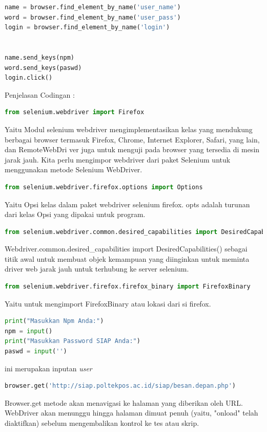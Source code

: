 \begin{enumerate}
\begin{lstlisting}[language=Python]
name = browser.find_element_by_name('user_name')
word = browser.find_element_by_name('user_pass')
login = browser.find_element_by_name('login')


name.send_keys(npm)
word.send_keys(paswd)
login.click()

\end{lstlisting}

Penjelasan Codingan :
\begin{lstlisting}[language=Python]
from selenium.webdriver import Firefox
\end{lstlisting}
Yaitu Modul selenium webdriver mengimplementasikan kelas yang mendukung berbagai browser termasuk Firefox, Chrome, Internet Explorer, Safari, yang lain, dan RemoteWebDri	ver juga untuk menguji pada browser yang tersedia di mesin jarak jauh. Kita perlu mengimpor webdriver dari paket Selenium untuk menggunakan metode Selenium WebDriver.

\begin{lstlisting}[language=Python]
from selenium.webdriver.firefox.options import Options
\end{lstlisting}
Yaitu Opsi kelas dalam paket webdriver selenium firefox. opts adalah turunan dari kelas Opsi yang dipakai untuk program.

\begin{lstlisting}[language=Python]
from selenium.webdriver.common.desired_capabilities import DesiredCapabilities
\end{lstlisting}
Webdriver.common.desired_capabilities import DesiredCapabilities()
sebagai titik awal untuk membuat objek kemampuan yang diinginkan untuk meminta driver web jarak jauh untuk terhubung ke server selenium.

\begin{lstlisting}[language=Python]
from selenium.webdriver.firefox.firefox_binary import FirefoxBinary
\end{lstlisting}
Yaitu untuk mengimport FirefoxBinary atau lokasi dari si firefox.

\begin{lstlisting}[language=Python]
print("Masukkan Npm Anda:")
npm = input()
print("Masukkan Password SIAP Anda:")
paswd = input('')

\end{lstlisting}
ini merupakan inputan \textit{user}

\begin{lstlisting}[language=Python]
browser.get('http://siap.poltekpos.ac.id/siap/besan.depan.php')
\end{lstlisting}
Browser.get metode akan menavigasi ke halaman yang diberikan oleh URL. WebDriver akan menunggu hingga halaman dimuat penuh (yaitu, "onload" telah diaktifkan) sebelum mengembalikan kontrol ke tes atau skrip.


\end{enumerate}
